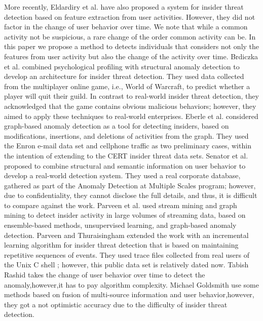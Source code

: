 \documentclass[conference]{IEEEtran}
\begin{document}
More recently, Eldardiry et al. \cite{b29} have also proposed a system for insider threat detection based on feature extraction from user activities. However, they did not factor in the change of user behavior over time. We note that while a common activity not be suspicious, a rare change of the order  common activity can be. In this paper we propose a method to detects individuals that considers not only the features from user activity but also the change of the activity over time. Brdiczka et al.  \cite{b30}combined psychological profiling with structural anomaly detection to develop an architecture for insider threat detection. They used data collected from the multiplayer online game, i.e., World of Warcraft, to predict whether a player will quit their guild. In contrast to real-world insider threat detection, they acknowledged that the game contains obvious malicious behaviors; however, they aimed to apply these techniques to real-world enterprises. Eberle et al. \cite{b31} considered graph-based anomaly detection as a tool for detecting insiders, based on modifications, insertions, and deletions of activities from the graph. They used the Enron e-mail data set \cite{b32} and cellphone traffic as two preliminary cases, within the intention of extending to the CERT insider threat data sets. Senator et al. \cite{b33} proposed to combine structural and semantic information on user behavior to develop a real-world detection system. They used a real corporate database, gathered as part of the Anomaly Detection at Multiple Scales program; however, due to confidentiality, they cannot disclose the full details, and thus, it is difficult to compare against the work. Parveen et al. \cite{b34} used stream mining and graph mining to detect insider activity in large volumes of streaming data, based on ensemble-based methods, unsupervised learning, and graph-based anomaly detection. Parveen and Thuraisingham \cite{b35} extended the work with an incremental learning algorithm for insider threat detection that is based on maintaining repetitive sequences of events. They used trace files collected from real users of the Unix C shell \cite{b36} ; however, this public data set is relatively dated now. Tabish Rashid \cite{b37} takes the change of user behavior  over time to detect the anomaly,however,it has to pay algorithm complexity. Michael Goldsmith use some methods based on fusion of multi-source information and user behavior\cite{b38},however, they got a not optimistic accuracy due to the difficulty of insider threat detection.
\end{document}
